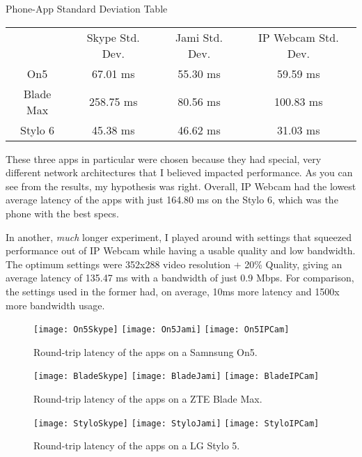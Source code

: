 \begin{centering}
Phone-App Standard Deviation Table\\[0.5cm]

\begin{tabular}{c|c|c|c}
    & Skype Std. Dev. & Jami Std. Dev. & IP Webcam Std. Dev. \\[0.5cm]
    On5 & 67.01 ms & 55.30 ms & 59.59 ms \\[0.5cm]
    Blade Max & 258.75 ms & 80.56 ms & 100.83 ms \\[0.5cm]
    Stylo 6 & 45.38 ms & 46.62 ms & 31.03 ms
\end{tabular} \newline

\end{centering}

These three apps in particular were chosen because they had special, very different network architectures that I believed impacted performance. As you can see from the results, my hypothesis was right. Overall, IP Webcam had the lowest average latency of the apps with just 164.80 ms on the Stylo 6, which was the phone with the best specs.

In another, \textit{much} longer experiment, I played around with settings that squeezed performance out of IP Webcam while having a usable quality and low bandwidth. The optimum settings were 352x288 video resolution + 20\% Quality, giving an average latency of 135.47 ms with a bandwidth of just 0.9 Mbps. For comparison, the settings used in the former had, on average, 10ms more latency and 1500x more bandwidth usage.


\begin{figure}[h]
    \centering
    \texttt{[image: On5Skype]}
    \texttt{[image: On5Jami]}
    \texttt{[image: On5IPCam]}
    \caption{
        Round-trip latency of the apps on a Samnsung On5.
    }
\end{figure}

\begin{figure}[h]
    \centering
    \texttt{[image: BladeSkype]}
    \texttt{[image: BladeJami]}
    \texttt{[image: BladeIPCam]}
    \caption{
        Round-trip latency of the apps on a ZTE Blade Max.
    }
\end{figure}

\begin{figure}[h]
    \centering
    \texttt{[image: StyloSkype]}
    \texttt{[image: StyloJami]}
    \texttt{[image: StyloIPCam]}
    \caption{
        Round-trip latency of the apps on a LG Stylo 5.
    }
\end{figure}
